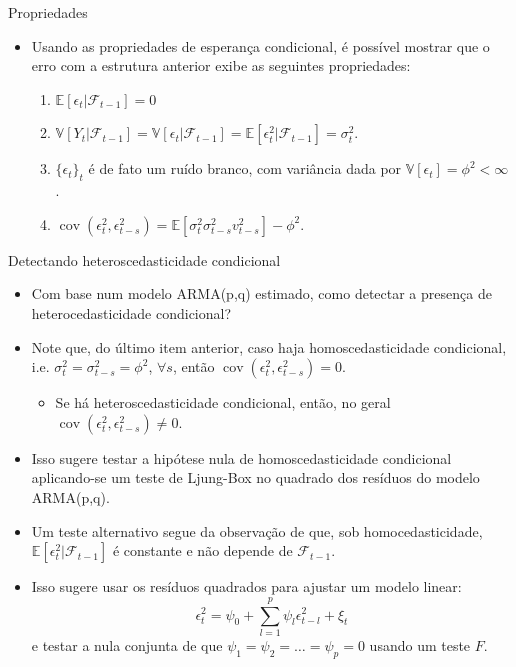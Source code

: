 \documentclass[11pt]{beamer}
\begin{document}
\begin{frame}{Propriedades }
\begin{itemize}
	\item Usando as propriedades de esperança condicional, é possível mostrar que o erro com a estrutura anterior exibe as seguintes propriedades:
	\begin{enumerate}
		\item $\mathbb{E}[\epsilon_t|\mathcal{F}_{t-1}] = 0$
		\item $\mathbb{V}[Y_t|\mathcal{F}_{t-1}]  = \mathbb{V}[\epsilon_t|\mathcal{F}_{t-1}] = \mathbb{E}[\epsilon_t^2|\mathcal{F}_{t-1}] = \sigma^2_t$.
		\item $\{\epsilon_t\}_t$ é de fato um ruído branco, com variância dada por $\mathbb{V}[\epsilon_t] = \phi^2 < \infty$. 
		\item $\operatorname{cov}(\epsilon_t^2, \epsilon_{t-s}^2) =\mathbb{E}[\sigma^2_t \sigma^2_{t-s} v_{t-s}^2] -  \phi^2$.
	\end{enumerate}
\end{itemize}
\end{frame}


\begin{frame}{Detectando heteroscedasticidade condicional}
\begin{itemize}
	\item Com base num modelo ARMA(p,q) estimado, como detectar a presença de heterocedasticidade condicional?
	\item Note que, do último item anterior, caso haja homoscedasticidade condicional, i.e. $\sigma^2_t=\sigma^2_{t-s} = \phi^2$, $\forall s$, então $\operatorname{cov}(\epsilon_t^2, \epsilon_{t-s}^2)= 0$.
	\begin{itemize}
		\item Se há heteroscedasticidade condicional, então, no geral $\operatorname{cov}(\epsilon_t^2, \epsilon_{t-s}^2) \neq 0$.
	\end{itemize}
	\item Isso sugere testar a hipótese nula de homoscedasticidade condicional aplicando-se um {\color{blue}teste de Ljung-Box no quadrado dos resíduos} do modelo ARMA(p,q).
	\item Um teste alternativo segue da observação de que, sob homocedasticidade, $\mathbb{E}[\epsilon_t^2|\mathcal{F}_{t-1}]$ é constante e não depende de $\mathcal{F}_{t-1}$.
	\item Isso sugere usar os resíduos quadrados para ajustar um modelo linear:
	$$ \epsilon_t^2  = \psi_0 + \sum_{l=1}^p \psi_l \epsilon_{t-l}^2 + \xi_t$$
	e testar a nula  conjunta de que $\psi_1 = \psi_2 =\ldots = \psi_p=0$ usando um teste $F$.
\end{itemize}
\end{frame}
\end{document}
